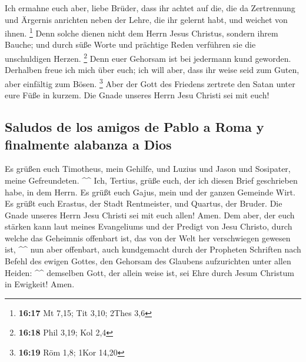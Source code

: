 Ich ermahne euch aber, liebe Brüder, dass ihr achtet auf
die, die da Zertrennung und Ärgernis anrichten neben der Lehre, die ihr
gelernt habt, und weichet von ihnen. \footnote{\textbf{16:17} Mt 7,15;
  Tit 3,10; 2Thes 3,6}  Denn solche dienen nicht dem
Herrn Jesus Christus, sondern ihrem Bauche; und durch süße Worte und
prächtige Reden verführen sie die unschuldigen Herzen. \footnote{\textbf{16:18}
  Phil 3,19; Kol 2,4}  Denn euer Gehorsam ist bei
jedermann kund geworden. Derhalben freue ich mich über euch; ich will
aber, dass ihr weise seid zum Guten, aber einfältig zum Bösen.
\footnote{\textbf{16:19} Röm 1,8; 1Kor 14,20}  Aber der
Gott des Friedens zertrete den Satan unter eure Füße in kurzem. Die
Gnade unseres Herrn Jesu Christi sei mit euch!

\hypertarget{saludos-de-los-amigos-de-pablo-a-roma-y-finalmente-alabanza-a-dios}{%
\subsection{Saludos de los amigos de Pablo a Roma y finalmente alabanza
a
Dios}\label{saludos-de-los-amigos-de-pablo-a-roma-y-finalmente-alabanza-a-dios}}

 Es grüßen euch Timotheus, mein Gehilfe, und Luzius und
Jason und Sosipater, meine Gefreundeten. \^{}\^{}  Ich,
Tertius, grüße euch, der ich diesen Brief geschrieben habe, in dem
Herrn.  Es grüßt euch Gajus, mein und der ganzen Gemeinde
Wirt. Es grüßt euch Erastus, der Stadt Rentmeister, und Quartus, der
Bruder.  Die Gnade unseres Herrn Jesu Christi sei mit
euch allen! Amen.  Dem aber, der euch stärken kann laut
meines Evangeliums und der Predigt von Jesu Christo, durch welche das
Geheimnis offenbart ist, das von der Welt her verschwiegen gewesen ist,
\^{}\^{}  nun aber offenbart, auch kundgemacht durch der
Propheten Schriften nach Befehl des ewigen Gottes, den Gehorsam des
Glaubens aufzurichten unter allen Heiden: \^{}\^{} 
demselben Gott, der allein weise ist, sei Ehre durch Jesum Christum in
Ewigkeit! Amen.
